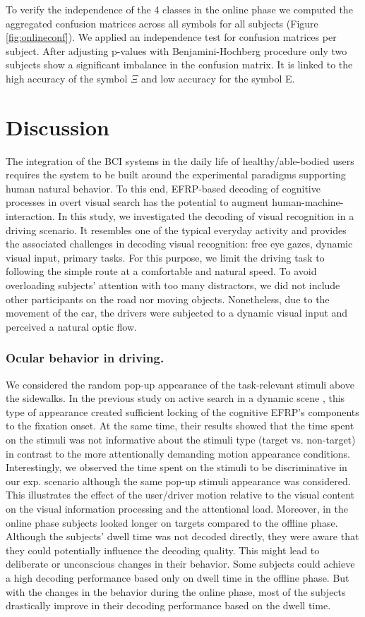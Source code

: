 \documentclass[12pt]{iopart}
\begin{document}
To verify the independence of the 4 classes in the online phase
we computed the aggregated confusion matrices across all symbols for all subjects (Figure \ref{fig:onlineconf}).
We applied an independence test for confusion matrices per subject.
After adjusting p-values with Benjamini-Hochberg procedure
only two subjects show a significant imbalance in the
confusion matrix. It is linked to the high accuracy of the symbol $\Xi$ and low accuracy 
for the symbol E.


\section{Discussion}
\label{sec:discussion}

The integration of the BCI systems in the daily life of 
healthy/able-bodied users requires the system 
to be built around the experimental paradigms
 supporting human natural behavior.
To this end, EFRP-based decoding of cognitive 
processes in overt visual search has the potential
to augment human-machine-interaction. 
In this study, we investigated the decoding of visual recognition in a driving scenario.
It resembles one of the typical everyday activity
and provides the associated challenges in decoding visual recognition:
free eye gazes, dynamic visual input, primary tasks.
For this purpose, we limit the driving task to following 
the simple route at a comfortable and natural speed.
To avoid overloading subjects' attention with too many distractors,
we did not include other participants on the road nor moving objects.
Nonetheless, due to the movement of the car, the drivers
were subjected to a dynamic visual input and perceived a
natural optic flow.

\subsubsection*{Ocular behavior in driving.}
We considered the random pop-up appearance of the task-relevant
stimuli above the sidewalks.  In the previous study
on active search in a dynamic scene \cite{uscumlic_active_2016},
this type of appearance created sufficient locking
of the cognitive EFRP's components to the fixation onset.
At the same time, their results showed that the time spent
on the stimuli was not informative about
the stimuli type (target vs. non-target) in contrast
to the more attentionally demanding motion appearance conditions.   
Interestingly, we observed  the time spent on the stimuli  to be
discriminative in our exp. scenario although the same
pop-up stimuli appearance was considered.
This illustrates the effect of the user/driver motion
relative to the visual content on the visual information
processing and the attentional load. Moreover, in the online phase
subjects looked longer on targets compared to the offline phase.
Although the subjects' dwell time was not decoded directly, they were aware
that they could potentially influence the decoding quality. This might
lead to deliberate or unconscious changes in their behavior.
Some subjects could achieve a high decoding performance based
only on dwell time in the offline phase. But with the changes in the behavior
during the online phase, most of the subjects drastically improve in their decoding performance
based on the dwell time.
\end{document}

